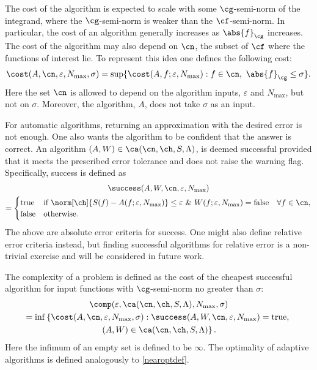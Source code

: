 \documentclass[]{elsarticle}
\theoremstyle{definition}
\theoremstyle{remark}
\newcommand{\Gnorm}[1]{\abs{#1}_{\cg}}
\begin{document}
The cost of the algorithm is expected to scale with some $\cg$-semi-norm of the integrand, where the $\cg$-semi-norm is weaker than the $\cf$-semi-norm.  In particular, the cost of an algorithm generally increases as $\Gnorm{f}$ increases.  The cost of the algorithm may also depend on $\cn$, the subset of $\cf$ where the functions of interest lie.  To represent this idea one defines the following cost:
\begin{equation*}
\cost(A,\cn,\varepsilon,N_{\max},\sigma)
= \sup \{ \cost(A,f;\varepsilon,N_{\max}) : f \in \cn, \ \Gnorm{f} \le \sigma \} .
\end{equation*}
Here the set $\cn$ is allowed to depend on the algorithm inputs, $\varepsilon$ and $N_{\max}$, but not on $\sigma$.  Moreover, the algorithm, $A$, does not take $\sigma$ as an input.

For automatic algorithms, returning an approximation with the desired error is not enough.  One also wants the algorithm to be confident that the answer is correct.  An  algorithm  $(A,W) \in \ca(\cn,\ch,S,\Lambda)$, is deemed successful provided that it meets the prescribed error tolerance and does not raise the warning flag.  Specifically, success is defined as
\begin{multline*}
\success(A,W,\cn,\varepsilon,N_{\max}) \\
= \begin{cases} \text{true} & \text{if } \displaystyle \norm[\ch]{S(f)-A(f;\varepsilon,N_{\max})} \le \varepsilon \ \& \ W(f;\varepsilon,N_{\max})=\text{false} \quad \forall  f \in \cn, \\
\displaystyle \text{false} & \text{otherwise}.
\end{cases}
\end{multline*}
The above are absolute error criteria for success.  One might also define relative error criteria instead, but finding successful algorithms for relative error is a non-trivial exercise and will be considered in future work.

The complexity of a problem is defined as the cost of the cheapest successful algorithm for input functions with $\cg$-semi-norm no greater than $\sigma$:
\begin{multline} \label{complexdef}
\comp(\varepsilon,\ca(\cn,\ch,S,\Lambda),N_{\max},\sigma) \\
 = \inf\left\{\cost(A,\cn,\varepsilon,N_{\max},\sigma) : \success(A,W,\cn,\varepsilon,N_{\max}) = \text{true}, \right .\\
\left.  (A,W) \in \ca(\cn,\ch,S,\Lambda) \right \}.
\end{multline}
Here the infimum of an empty set is defined to be $\infty$.  The optimality of adaptive algorithms is defined analogously to \eqref{nearoptdef}.
\end{document}

